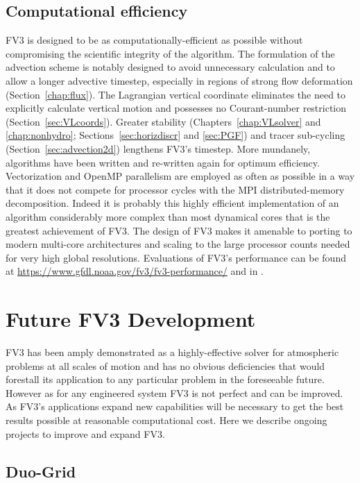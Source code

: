 \documentclass[10pt,letterpaper,margin=1in]{memoir}
\begin{document}
\subsection{Computational efficiency} FV3 is designed to be as computationally-efficient as possible without compromising the scientific integrity of the algorithm. The formulation of the advection scheme is notably designed to avoid unnecessary calculation and to allow a longer advective timestep, especially in regions of strong flow deformation (Section~\ref{chap:flux}). The Lagrangian vertical coordinate eliminates the need to explicitly calculate vertical motion and possesses no Courant-number restriction (Section~\ref{sec:VLcoords}). Greater stability (Chapters~\ref{chap:VLsolver} and \ref{chap:nonhydro}; Sections~\ref{sec:horizdiscr} and \ref{sec:PGF}) and tracer sub-cycling (Section~\ref{sec:advection2d}) lengthens FV3's timestep.  More mundanely, algorithms have been written and re-written again for optimum efficiency. Vectorization and OpenMP parallelism are employed as often as possible in a way that it does not compete for processor cycles with the MPI distributed-memory decomposition. Indeed it is probably this highly efficient implementation of an algorithm considerably more complex than most dynamical cores that is the greatest achievement of FV3. The design of FV3 makes it amenable to porting to modern multi-core architectures and scaling to the large processor counts needed for very high global resolutions. Evaluations of FV3's performance can be found at \href{https://www.gfdl.noaa.gov/fv3/fv3-performance/}{https://www.gfdl.noaa.gov/fv3/fv3-performance/} and in \citet{Stevens2019}.

\section{Future FV3 Development}

FV3 has been amply demonstrated as a highly-effective solver for atmospheric problems at all scales of motion and has no obvious deficiencies that would forestall its application to any particular problem in the foreseeable future. However as for any engineered system FV3 is not perfect and can be improved. As FV3's applications expand new capabilities will be necessary to get the best results possible at reasonable computational cost. Here we describe ongoing projects to improve and expand FV3.

\subsection{Duo-Grid}
\end{document}

